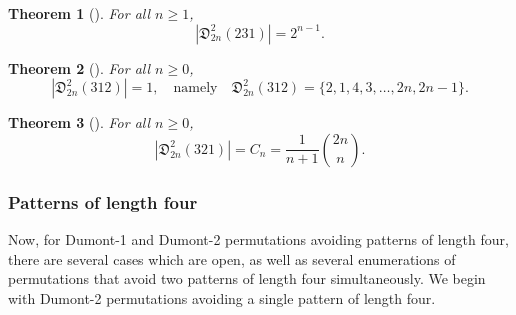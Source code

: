 \documentclass[
final
]{dmtcs-episciences}
\newtheorem{theorem}{Theorem}[section]%
\theoremstyle{definition}
\theoremstyle{remark}
\begin{document}
\begin{theorem}[\cite{Burstein_Restricted}]
For all $n\ge 1$,
\[
|\mathfrak{D}^2_{2n} (231)| = 2^{n-1}.
\] 
\end{theorem}

\begin{theorem}[\cite{Burstein_Restricted}]
 For all $n\ge 0$,
\[
|\mathfrak{D}^2_{2n} (312)| = 1, \quad \text{namely} \quad \mathfrak{D}^2_{2n} (312) = \{2, 1, 4, 3, \dots, 2n, 2n-1\}.
\] 
\end{theorem}

\begin{theorem}[\cite{Mansour}]
For all $n\ge 0$,
\[
|\mathfrak{D}^2_{2n} (321)| = C_n = \frac{1}{n+1} \binom{2n}{n}.
\]
\end{theorem}


\subsubsection{Patterns of length four}
\label{length four_thms}

Now, for Dumont-1 and Dumont-2 permutations avoiding patterns of length four, there are several cases which are open, as well as several enumerations of permutations that avoid two patterns of length four simultaneously.  We begin with Dumont-2 permutations avoiding a single pattern of length four.  
\end{document}
